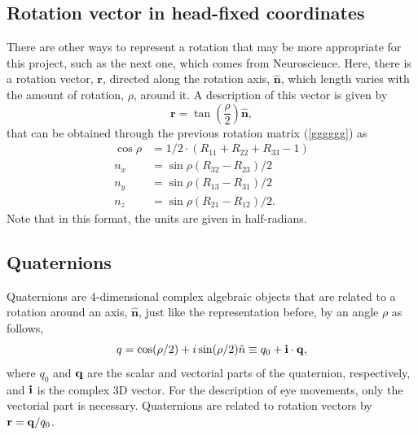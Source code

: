 \subsection{Rotation vector in head-fixed coordinates}
\label{killme}
There are other ways to represent a rotation that may be more appropriate for this project, such as the next one, which comes from Neuroscience. Here, there is a rotation vector, $\mathbf{r}$, directed along the rotation axis, $\hat{\mathbf{n}}$, which length varies with the amount of rotation, $\rho$, around it. A description of this vector is given by 
\begin{equation}
\mathbf{r} = \tan (\frac{\rho}{2}) \hat{ \mathbf{n}},
\end{equation}
that can be obtained through the previous rotation matrix (\ref{gggggg}) as 
\begin{equation}
\label{sec2:eq:n}
\begin{aligned} 
\cos \rho & = 1 / 2 \cdot \left( R _ { 11 } + R _ { 22 } + R _ { 33 } - 1 \right) \\ 
n_ { x } & = \sin \rho \left( R _ { 32 } - R _ { 23 } \right) / 2  \\ 
n _ { y } & = \sin \rho \left( R _ { 13 } - R _ { 31 } \right) / 2  \\ 
n _ { z } & = \sin \rho \left( R _ { 21 } - R _ { 12 } \right) / 2  .
\end{aligned}
\end{equation}
Note that in this format, the units are given in half-radians.

\subsection{Quaternions}
Quaternions are 4-dimensional complex algebraic objects that are related to a rotation around an axis, $\hat{ \mathbf{n}}$, just like the representation before, by an angle $\rho$ as follows,
\begin{equation}
\label{sec2:eq:q}
q = \cos ( \rho / 2 ) + i \sin ( \rho / 2 ) \hat{n} \equiv q _ { 0 } + {\bf i}\cdot  {\bf q},
\end{equation}
where $q_0$ and ${\bf q}$ are the scalar and vectorial parts of the quaternion, respectively, and ${\bf i}$ is the complex 3D vector. For the description of eye movements, only the vectorial part is necessary. Quaternions are related to rotation vectors by $ \mathbf{r}  = {\bf q} / q _ { 0 }$.
\cite{eye}


